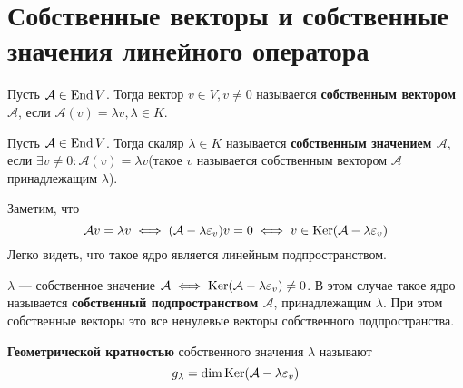 \documentclass[../main.tex]{subfiles}
\begin{document}

\section{Собственные векторы и собственные значения линейного оператора}

\begin{definition}
  Пусть $\mathcal{A} \in \operatorname{End} V$. Тогда вектор $v \in V, v \neq 0$ называется \textbf{собственным вектором $\mathcal{A}$}, если $\mathcal{A}(v) = \lambda v, \lambda \in K$.
\end{definition}

\begin{definition}
  Пусть $\mathcal{A} \in \operatorname{End} V$. Тогда скаляр $\lambda \in K$ называется \textbf{собственным значением $\mathcal{A}$}, если $\exists v \neq 0\colon \mathcal{A}(v) = \lambda v$(такое $v$ называется собственным вектором $\mathcal{A}$ принадлежащим $\lambda$).
\end{definition}

Заметим, что
\begin{equation*}
  \mathcal{A}v = \lambda v \iff (\mathcal{A} - \lambda \varepsilon_v) v = 0
  \iff
  v \in \operatorname{Ker}(\mathcal{A} - \lambda \varepsilon_v)
\end{equation*}
Легко видеть, что такое ядро является линейным подпространством.

\begin{remark}
  $\lambda$ --- собственное значение $\mathcal{A} \iff \operatorname{Ker} (\mathcal{A} - \lambda \varepsilon_v) \neq 0$. В этом случае такое ядро называется \textbf{собственный подпространством $\mathcal{A}$}, принадлежащим $\lambda$. При этом собственные векторы это все ненулевые векторы собственного подпространства.
\end{remark}

\begin{definition}
  \textbf{Геометрической кратностью} собственного значения $\lambda$ называют
  \begin{equation*}
    g_{\lambda} = \dim \operatorname{Ker}(\mathcal{A} - \lambda \varepsilon_v)
  \end{equation*}
\end{definition}
\end{document}
